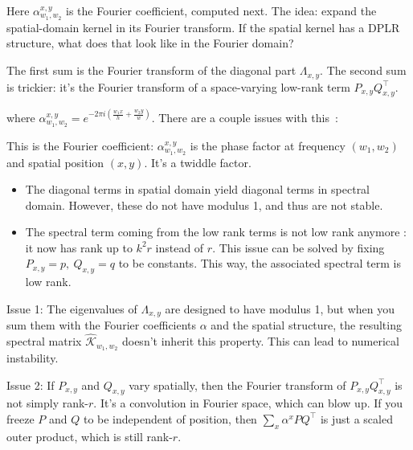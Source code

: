 \begin{ThomasAnnotation}
Here $\alpha_{w_1, w_2}^{x,y}$ is the Fourier coefficient, computed next. The idea: expand the spatial-domain kernel in its Fourier transform. If the spatial kernel has a DPLR structure, what does that look like in the Fourier domain?

The first sum is the Fourier transform of the diagonal part $\Lambda_{x,y}$. The second sum is trickier: it's the Fourier transform of a space-varying low-rank term $P_{x,y} Q_{x,y}^\top$.
\end{ThomasAnnotation}

\noindent where $\alpha_{w_1,w_2}^{x,y} = e^{-2\pi i(\frac{w_1x}{h}+\frac{w_2y}{w})}$. There are a couple issues with this~:

\begin{ThomasAnnotation}
This is the Fourier coefficient: $\alpha_{w_1, w_2}^{x,y}$ is the phase factor at frequency $(w_1, w_2)$ and spatial position $(x, y)$. It's a twiddle factor.
\end{ThomasAnnotation}

\begin{itemize}
    \item The diagonal terms in spatial domain yield diagonal terms in spectral domain. However, these do not have modulus 1, and thus are not stable.
    \item The spectral term coming from the low rank terms is not low rank anymore : it now has rank up to $k^2r$ instead of $r$. This issue can be solved by fixing $P_{x,y}=p,~Q_{x,y}=q$ to be constants. This way, the associated spectral term is low rank.
\end{itemize}

\begin{ThomasAnnotation}
Issue 1: The eigenvalues of $\Lambda_{x,y}$ are designed to have modulus 1, but when you sum them with the Fourier coefficients $\alpha$ and the spatial structure, the resulting spectral matrix $\hat{\mathcal{K}}_{w_1, w_2}$ doesn't inherit this property. This can lead to numerical instability.

Issue 2: If $P_{x,y}$ and $Q_{x,y}$ vary spatially, then the Fourier transform of $P_{x,y} Q_{x,y}^\top$ is not simply rank-$r$. It's a convolution in Fourier space, which can blow up. If you freeze $P$ and $Q$ to be independent of position, then $\sum_x \alpha^x P Q^\top$ is just a scaled outer product, which is still rank-$r$.
\end{ThomasAnnotation}


